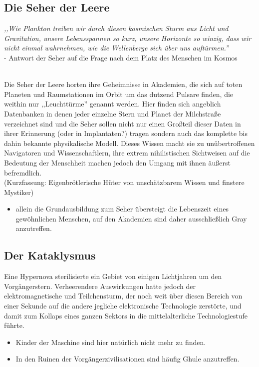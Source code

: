 \documentclass[10pt,a4paper]{report}
\begin{document}
\subsection*{Die Seher der Leere}
\textit{,,Wie Plankton treiben wir durch diesen kosmischen Sturm aus Licht und Gravitation, unsere Lebensspannen so kurz, unsere Horizonte so winzig, dass wir nicht einmal wahrnehmen, wie die Wellenberge sich über uns auftürmen.''}\\ - Antwort der Seher auf die Frage nach dem Platz des Menschen im Kosmos\\	\

Die Seher der Leere horten ihre Geheimnisse in Akademien, die sich auf toten Planeten und Raumstationen im Orbit um das dutzend Pulsare finden, die weithin nur ,,Leuchttürme'' genannt werden. Hier finden sich angeblich Datenbanken in denen jeder einzelne Stern und Planet der Milchstraße verzeichnet sind und die Seher sollen nicht nur einen Großteil dieser Daten in ihrer Erinnerung (oder in Implantaten?) tragen sondern auch das komplette bis dahin bekannte physikalische Modell. Dieses Wissen macht sie zu unübertroffenen Navigatoren und Wissenschaftlern, ihre extrem nihilistischen Sichtweisen auf die Bedeutung der Menschheit machen jedoch den Umgang mit ihnen äußerst befremdlich.\\
(Kurzfassung: Eigenbrötlerische Hüter von unschätzbarem Wissen und finstere Mystiker)
\begin{itemize}
\item allein die Grundausbildung zum Seher übersteigt die Lebenszeit eines gewöhnlichen Menschen, auf den Akademien sind daher ausschließlich Gray anzutreffen.
\end{itemize}

\subsection*{Der Kataklysmus}
Eine Hypernova sterilisierte ein Gebiet von einigen Lichtjahren um den Vorgängerstern. Verheerendere Auswirkungen hatte jedoch der elektromagnetische und Teilchensturm, der noch weit über diesen Bereich von einer Sekunde auf die andere jegliche elektronische Technologie zerstörte, und damit zum Kollaps eines ganzen Sektors in die mittelalterliche Technologiestufe führte.
\begin{itemize}
\item Kinder der Maschine sind hier natürlich nicht mehr zu finden.
\item In den Ruinen der Vorgängerzivilisationen sind häufig Ghule anzutreffen.
\end{itemize}
\end{document}

